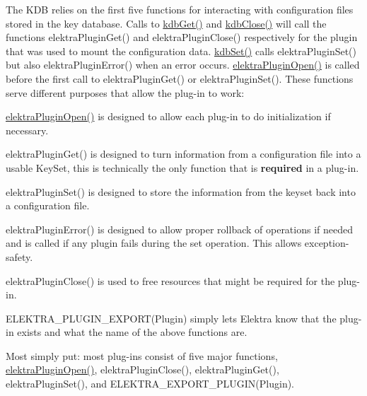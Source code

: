 The K\+DB relies on the first five functions for interacting with configuration files stored in the key database. Calls to {\ttfamily \hyperlink{group__kdb_ga28e385fd9cb7ccfe0b2f1ed2f62453a1}{kdb\+Get()}} and {\ttfamily \hyperlink{group__kdb_gadb54dc9fda17ee07deb9444df745c96f}{kdb\+Close()}} will call the functions {\ttfamily elektra\+Plugin\+Get()} and {\ttfamily elektra\+Plugin\+Close()} respectively for the plugin that was used to mount the configuration data. {\ttfamily \hyperlink{group__kdb_ga11436b058408f83d303ca5e996832bcf}{kdb\+Set()}} calls {\ttfamily elektra\+Plugin\+Set()} but also {\ttfamily elektra\+Plugin\+Error()} when an error occurs. {\ttfamily \hyperlink{elektra_2plugin_8c_a32a70a7876542c51d153164ac5108a57}{elektra\+Plugin\+Open()}} is called before the first call to {\ttfamily elektra\+Plugin\+Get()} or {\ttfamily elektra\+Plugin\+Set()}. These functions serve different purposes that allow the plug-\/in to work\+:


\begin{DoxyItemize}
\item {\ttfamily \hyperlink{elektra_2plugin_8c_a32a70a7876542c51d153164ac5108a57}{elektra\+Plugin\+Open()}} is designed to allow each plug-\/in to do initialization if necessary.
\item {\ttfamily elektra\+Plugin\+Get()} is designed to turn information from a configuration file into a usable {\ttfamily Key\+Set}, this is technically the only function that is {\bfseries required} in a plug-\/in.
\item {\ttfamily elektra\+Plugin\+Set()} is designed to store the information from the keyset back into a configuration file.
\item {\ttfamily elektra\+Plugin\+Error()} is designed to allow proper rollback of operations if needed and is called if any plugin fails during the set operation. This allows exception-\/safety.
\item {\ttfamily elektra\+Plugin\+Close()} is used to free resources that might be required for the plug-\/in.
\item {\ttfamily E\+L\+E\+K\+T\+R\+A\+\_\+\+P\+L\+U\+G\+I\+N\+\_\+\+E\+X\+P\+O\+R\+T(\+Plugin)} simply lets Elektra know that the plug-\/in exists and what the name of the above functions are.
\end{DoxyItemize}

Most simply put\+: most plug-\/ins consist of five major functions, {\ttfamily \hyperlink{elektra_2plugin_8c_a32a70a7876542c51d153164ac5108a57}{elektra\+Plugin\+Open()}}, {\ttfamily elektra\+Plugin\+Close()}, {\ttfamily elektra\+Plugin\+Get()}, {\ttfamily elektra\+Plugin\+Set()}, and {\ttfamily E\+L\+E\+K\+T\+R\+A\+\_\+\+E\+X\+P\+O\+R\+T\+\_\+\+P\+L\+U\+G\+I\+N(\+Plugin)}.

